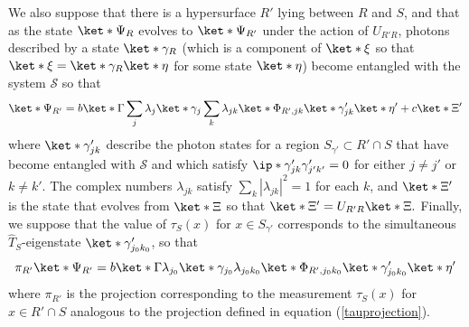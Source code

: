 \documentclass[12pt]{report}
\begin{document}
We also suppose that there is a hypersurface $R'$ lying between $R$ and $S$, and that as the state $\ket*{\Psi_R}$ evolves to $\ket*{\Psi_{R'}}$ under the action of $U_{R'R}$, photons described by a state $\ket*{\gamma_R}$ (which is a component of $\ket*{\xi}$ so that $\ket*{\xi}=\ket*{\gamma_R}\ket*{\eta}$ for some state $\ket*{\eta}$) become entangled with the system $\mathcal{S}$ so that
\begin{equation}
\ket*{\Psi_{R'}}=b\ket*{\Gamma}\sum_j \lambda_j \ket*{\gamma_{j}} \sum_k\lambda_{jk} \ket*{\Phi_{R', jk}}\ket*{\gamma_{jk}'}\ket*{\eta'}+c\ket*{\Xi'}
\end{equation}
where $\ket*{\gamma_{jk}'}$ describe the photon states for a region $S_{\gamma'}\subset R'\cap S$ that have become entangled with $\mathcal{S}$ and which satisfy  $\ip*{\gamma_{jk}'}{\gamma_{j'k'}'}=0$ for either $j\neq j'$ or $k\neq k'$. The complex numbers $\lambda_{jk}$ satisfy $\sum_k|\lambda_{jk}|^2=1$ for each $k$, and $\ket*{\Xi'}$ is the state that evolves from $\ket*{\Xi}$ so that $\ket*{\Xi'}=U_{R'R}\ket*{\Xi}.$ Finally, we suppose that the value of $\tau_S(x)$ for $x\in S_{\gamma'}$ corresponds to the simultaneous $\hat{T}_S$-eigenstate $\ket*{\gamma_{j_0k_0}'}$, so that
$$\pi_{R'}\ket*{\Psi_{R'}}= b\ket*{\Gamma} \lambda_{j_0} \ket*{\gamma_{j_0}} \lambda_{j_0k_0} \ket*{\Phi_{R', j_0k_0}}\ket*{\gamma_{j_0k_0}'}\ket*{\eta'}$$
where $\pi_{R'}$ is the projection corresponding to the measurement $\tau_S(x)$ for $x\in R'\cap S$ analogous to the projection defined in equation (\ref{tauprojection}).
\end{document}
